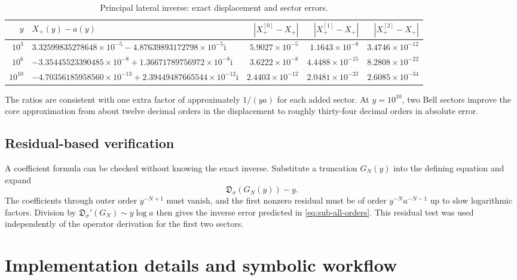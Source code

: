 \documentclass[11pt,a4paper]{article}
\numberwithin{equation}{section}
\theoremstyle{definition}
\theoremstyle{remark}
\newcommand{\ii}{\mathrm i}
\newcommand{\Sub}{\mathfrak D}
\begin{document}
\begin{table}[htbp]
\centering
\small
\caption{Principal lateral inverse: exact displacement and sector errors.}
\label{tab:lateral-errors}
\begin{tabular}{@{}r >{\raggedright\arraybackslash}p{5.4cm} rrr@{}}
\toprule
$y$ & $X_+(y)-a(y)$
& $|X_+^{[0]}-X_+|$
& $|X_+^{[1]}-X_+|$
& $|X_+^{[2]}-X_+|$\\
\midrule
$10^3$
& $3.32599835278648\times 10^{-5}-4.87639893172798\times 10^{-5}\ii$
& $5.9027\times 10^{-5}$ & $1.1643\times 10^{-8}$ & $3.4746\times 10^{-12}$\\
$10^6$
& $-3.35445523390485\times 10^{-8}+1.36671789756972\times 10^{-8}\ii$
& $3.6222\times 10^{-8}$ & $4.4488\times 10^{-15}$ & $8.2808\times 10^{-22}$\\
$10^{10}$
& $-4.70356185958560\times 10^{-13}+2.39449487665544\times 10^{-12}\ii$
& $2.4403\times 10^{-12}$ & $2.0481\times 10^{-23}$ & $2.6085\times 10^{-34}$\\
\bottomrule
\end{tabular}
\end{table}

The ratios are consistent with one extra factor of approximately
$1/(ya)$ for each added sector.  At $y=10^{10}$, two Bell sectors improve
the core approximation from about twelve decimal orders in the displacement
to roughly thirty-four decimal orders in absolute error.

\subsection{Residual-based verification}

A coefficient formula can be checked without knowing the exact inverse.
Substitute a truncation $G_N(y)$ into the defining equation and expand
\begin{equation}\label{eq:formal-residual-check}
 \Sub_\sigma(G_N(y))-y.
\end{equation}
The coefficients through outer order $y^{-N+1}$ must vanish, and the first
nonzero residual must be of order $y^{-N}a^{-N-1}$ up to slow logarithmic
factors.  Division by
$\Sub_\sigma'(G_N)\sim y\log a$ then gives the inverse error predicted in
\eqref{eq:sub-all-orders}.  This residual test was used independently of the
operator derivation for the first two sectors.

\section{Implementation details and symbolic workflow}
\label{sec:implementation}
\end{document}
